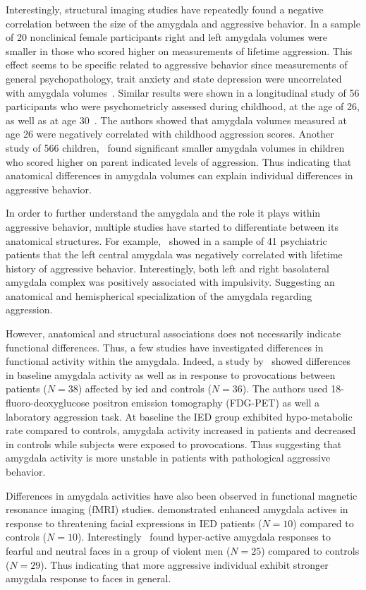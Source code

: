 Interestingly, structural imaging studies have repeatedly found a negative correlation between the size of the amygdala and aggressive behavior.
In a sample of 20 nonclinical female participants right and left amygdala volumes were smaller in those who scored higher on measurements of lifetime aggression.
This effect seems to be specific related to aggressive behavior since measurements of general psychopathology, trait anxiety and state depression were uncorrelated with amygdala volumes~\cite{Matthies2012}.
Similar results were shown in a longitudinal study of 56 participants who were psychometricly assessed during childhood, at the age of 26, as well as at age 30~\cite{Pardini2014}.
The authors showed that amygdala volumes measured at age 26 were negatively correlated with childhood aggression scores.
Another study of 566 children,~\citet{Thijssen2015} found significant smaller amygdala volumes in children who scored higher on parent indicated levels of aggression.
Thus indicating that anatomical differences in amygdala volumes can explain individual differences in aggressive behavior.

In order to further understand the amygdala and the role it plays within aggressive behavior, multiple studies have started to differentiate between its anatomical structures.
For example,~\citet{Gopal2013} showed in a sample of 41 psychiatric patients that the left central amygdala was negatively correlated with lifetime history of aggressive behavior.
Interestingly, both left and right basolateral amygdala complex was positively associated with impulsivity.
Suggesting an anatomical and hemispherical specialization of the amygdala regarding aggression.

However, anatomical and structural associations does not necessarily indicate functional differences.
Thus, a few studies have investigated differences in functional activity within the amygdala.
Indeed, a study by~\citet{New2009} showed differences in baseline amygdala activity as well as in response to provocations between patients ($N=38$) affected by \acrfull{ied} and controls ($N=36$).
The authors used 18-fluoro-deoxyglucose positron emission tomography (FDG-PET) as well a laboratory aggression task.
At baseline the IED group exhibited hypo-metabolic rate compared to controls, amygdala activity increased in patients and decreased in controls while subjects were exposed to provocations.
Thus suggesting that amygdala activity is more unstable in patients with pathological aggressive behavior.

Differences in amygdala activities have also been observed in functional magnetic resonance imaging (fMRI) studies.
\citet{Coccaro2007} demonstrated enhanced amygdala actives in response to threatening facial expressions in IED patients ($N=10$) compared to controls ($N=10$).
Interestingly~\citet{Bobes2013} found hyper-active amygdala responses to fearful and neutral faces in a group of violent men ($N=25$) compared to controls ($N=29$). 
Thus indicating that more aggressive individual exhibit stronger amygdala response to faces in general.

